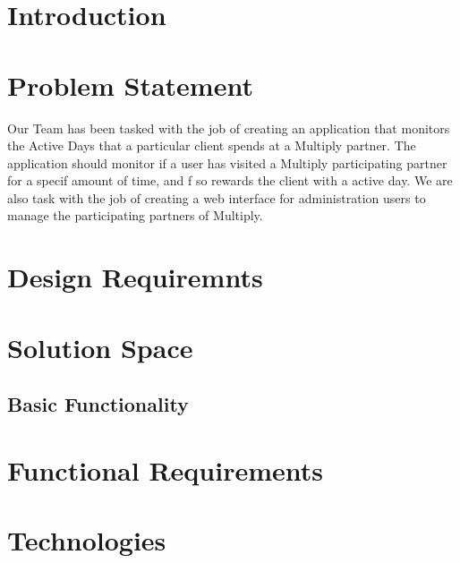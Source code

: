 \documentclass[11pt]{article}
\begin{document}
	\section{Introduction}
	\section{Problem Statement}
	Our Team has been tasked with the job of creating an application that monitors the Active Days that a particular client spends  at a Multiply partner. The application should monitor if a user has visited a Multiply participating partner for a specif amount of time, and f so rewards the client with a active day. We are also task with the job of creating a web interface for administration users to manage the participating partners of Multiply. 
	\section{Design Requiremnts} 
	\section{Solution Space}
	\subsection{Basic Functionality}
	
	\section{Functional Requirements}
	\section{Technologies}
	
	
\end{document}
